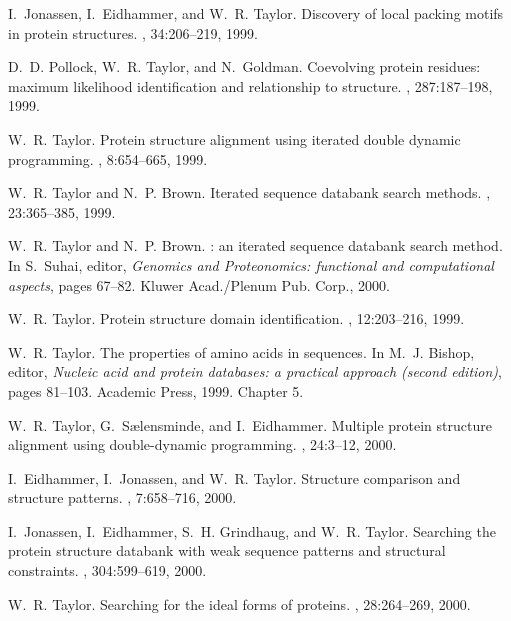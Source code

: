 \begin{thebibliography}{100}
I.~Jonassen, I.~Eidhammer, and W.~R. Taylor.
\newblock Discovery of local packing motifs in protein structures.
, 34:206--219, 1999.

D.~D. Pollock, W.~R. Taylor, and N.~Goldman.
\newblock Coevolving protein residues: maximum likelihood identification and
  relationship to structure.
, 287:187--198, 1999.

W.~R. Taylor.
\newblock Protein structure alignment using iterated double dynamic
  programming.
, 8:654--665, 1999.

W.~R. Taylor and N.~P. Brown.
\newblock Iterated sequence databank search methods.
, 23:365--385, 1999.

W.~R. Taylor and N.~P. Brown.
: an iterated sequence databank search method.
\newblock In S.~Suhai, editor, {\em Genomics and Proteonomics: functional and
  computational aspects}, pages 67--82. Kluwer Acad./Plenum Pub. Corp., 2000.

W.~R. Taylor.
\newblock Protein structure domain identification.
, 12:203--216, 1999.

W.~R. Taylor.
\newblock The properties of amino acids in sequences.
\newblock In M.~J. Bishop, editor, {\em Nucleic acid and protein databases: a
  practical approach (second edition)}, pages 81--103. Academic Press, 1999.
\newblock Chapter 5.

W.~R. Taylor, G.~S{\ae}lensminde, and I.~Eidhammer.
\newblock Multiple protein structure alignment using double-dynamic
  programming.
, 24:3--12, 2000.

I.~Eidhammer, I.~Jonassen, and W.~R. Taylor.
\newblock Structure comparison and structure patterns.
, 7:658--716, 2000.

I.~Jonassen, I.~Eidhammer, S.~H. Grindhaug, and W.~R. Taylor.
\newblock Searching the protein structure databank with weak sequence patterns
  and structural constraints.
, 304:599--619, 2000.

W.~R. Taylor.
\newblock Searching for the ideal forms of proteins.
, 28:264--269, 2000.


\end{thebibliography}
